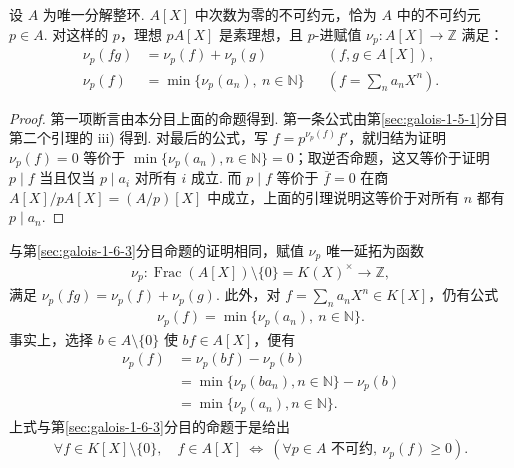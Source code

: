 \begin{corollary*}
设 $A$ 为唯一分解整环. $A[X]$ 中次数为零的不可约元，恰为 $A$ 中的不可约元 $p\in A$. 对这样的 $p$，理想 $pA[X]$ 是素理想，且 $p$-进赋值 $\nu_p:A[X]\longrightarrow\mathbb Z$ 满足：
\begin{align*}
\nu_p(fg)&=\nu_p(f)+\nu_p(g) &&(f,g\in A[X]),\\
\nu_p(f)&=\min\{\nu_p(a_n),\ n\in\mathbb N\} &&\left(f=\sum_n a_nX^n\right).
\end{align*}
\end{corollary*}
\begin{proof}
第一项断言由本分目上面的命题得到. 第一条公式由第\ref{sec:galois-1-5-1}分目第二个引理的 iii) 得到. 对最后的公式，写 $f=p^{\nu_p(f)}f'$，就归结为证明 $\nu_p(f)=0$ 等价于 $\min\{\nu_p(a_n),n\in\mathbb N\}=0$；取逆否命题，这又等价于证明 $p\mid f$ 当且仅当 $p\mid a_i$ 对所有 $i$ 成立. 而 $p\mid f$ 等价于 $\overline f=0$ 在商 $A[X]/pA[X]=(A/p)[X]$ 中成立，上面的引理说明这等价于对所有 $n$ 都有 $p\mid a_n$.
\end{proof}
\begin{remark*}
与第\ref{sec:galois-1-6-3}分目命题的证明相同，赋值 $\nu_p$ 唯一延拓为函数
\begin{align*}
\nu_p:\operatorname{Frac}(A[X])\setminus\{0\}=K(X)^\times\longrightarrow\mathbb Z,
\end{align*}
满足 $\nu_p(fg)=\nu_p(f)+\nu_p(g)$. 此外，对 $f=\sum_n a_nX^n\in K[X]$，仍有公式
\begin{align*}
\nu_p(f)=\min\{\nu_p(a_n),\ n\in\mathbb N\}.
\end{align*}
事实上，选择 $b\in A\setminus\{0\}$ 使 $bf\in A[X]$，便有
\begin{align*}
\nu_p(f)&=\nu_p(bf)-\nu_p(b)\\
&=\min\{\nu_p(ba_n),n\in\mathbb N\}-\nu_p(b)\\
&=\min\{\nu_p(a_n),n\in\mathbb N\}.
\end{align*}
上式与第\ref{sec:galois-1-6-3}分目的命题于是给出
\begin{align*}
\forall f\in K[X]\setminus\{0\},\quad
f\in A[X]\ \Longleftrightarrow\ (\forall p\in A\text{ 不可约},\ \nu_p(f)\geqslant0).
\end{align*}
\end{remark*}
